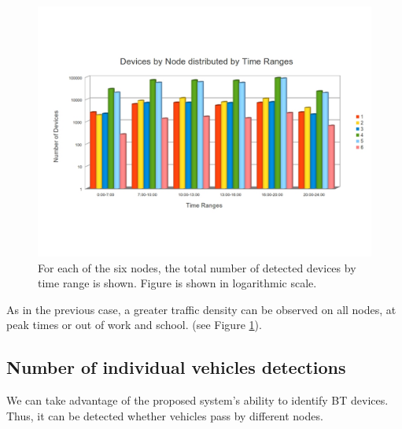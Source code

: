 \documentclass{llncs}
\begin{document}
 \begin{figure}[htb]
 \begin{center}
 \includegraphics[scale=0.4]{VehiculosPorHoras.jpg}
 \caption{For each of the six nodes, the total number of detected devices by time range is shown. Figure is shown in logarithmic scale.
 \label{VehiculosPorHoras}}
 \end{center}
 \end{figure}
 
As in the previous case, a greater traffic density can be observed on all nodes, at peak times or out of work and school. (see Figure \ref{VehiculosPorHoras}).


\subsection{Number of individual vehicles detections}

We can take advantage of the proposed system's ability to identify BT devices. Thus, it can be detected whether vehicles pass by different nodes.
\end{document}
